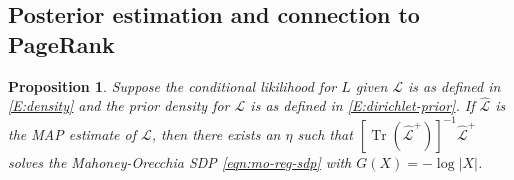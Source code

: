 \documentclass[12pt]{article}
\DeclareMathOperator*{\Tr}{Tr}
\theoremstyle{plain}
\newtheorem{proposition}[theorem]{Proposition}
\begin{document}
\begin{figure}
{      
    }
\end{figure}



\subsection{Posterior estimation and connection to PageRank}
\label{S:posterior-density}

\begin{proposition}\label{P:map-sdp}
  Suppose the conditional likilihood for $L$ given $\mathcal{L}$ is as
  defined in \eqref{E:density} and the prior density for $\mathcal{L}$
  is as defined in \eqref{E:dirichlet-prior}.  If
  $\mathcal{\hat L}$ is the MAP estimate of $\mathcal{L}$, then
  there exists an $\eta$ such that
  $[\Tr(\mathcal{\hat L}^+)]^{-1} \mathcal{\hat L}^+$ solves the
  Mahoney-Orecchia SDP \eqref{eqn:mo-reg-sdp} with $G(X) = -\log |X|$.
\end{proposition}
\end{document}
